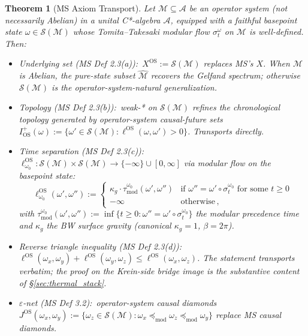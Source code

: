 \documentclass[11pt,a4paper]{article}
\theoremstyle{plain}
\newtheorem{theorem}{Theorem}[section]
\theoremstyle{definition}
\newcommand{\Acal}{\mathcal{A}}
\newcommand{\Scal}{\mathcal{S}}
\newcommand{\Mcal}{\mathcal{M}}
\newcommand{\tmod}{\tau_{\mathrm{mod}}}
\newcommand{\kappag}{\kappa_{g}}
\newcommand{\ellOS}{\ell^{\mathrm{OS}}}
\begin{document}
\begin{theorem}[MS Axiom Transport]\label{thm:axiom_transport}
Let $\Mcal\subseteq\Acal$ be an operator system (not necessarily
Abelian) in a unital C*-algebra $\Acal$, equipped with a faithful
basepoint state $\omega\in\Scal(\Mcal)$ whose Tomita--Takesaki
modular flow $\sigma_{t}^{\omega}$ on $\Mcal$ is well-defined. Then:

\begin{itemize}
\item[(a)] \emph{Underlying set} (MS Def 2.3(a)):\
$X^{\mathrm{OS}}:=\Scal(\Mcal)$ replaces MS's $X$. When $\Mcal$ is
Abelian, the pure-state subset $\widehat{\Mcal}$ recovers the Gelfand
spectrum; otherwise $\Scal(\Mcal)$ is the operator-system-natural
generalization.
\item[(b)] \emph{Topology} (MS Def 2.3(b)):\ weak-* on $\Scal(\Mcal)$
refines the chronological topology generated by operator-system
causal-future sets $I^{+}_{\mathrm{OS}}(\omega):=\{\omega'\in
\Scal(\Mcal):\ellOS(\omega,\omega')>0\}$. Transports directly.
\item[(c)] \emph{Time separation} (MS Def 2.3(c)):\
$\ellOS_{\omega_{0}}:\Scal(\Mcal)\times\Scal(\Mcal)\to
\{-\infty\}\cup[0,\infty]$ via modular flow on the basepoint state:
\begin{equation}
  \ellOS_{\omega_{0}}(\omega',\omega'') := \begin{cases}
    \kappag\cdot\tmod^{\omega_{0}}(\omega',\omega'') & \text{if } \omega''=\omega'\circ\sigma_{t}^{\omega_{0}}\text{ for some }t\ge 0\\
    -\infty & \text{otherwise}\,,
  \end{cases}
  \label{eq:ellOS}
\end{equation}
with $\tmod^{\omega_{0}}(\omega',\omega''):=\inf\{t\ge 0:
\omega''=\omega'\circ\sigma_{t}^{\omega_{0}}\}$ the modular
precedence time and $\kappag$ the BW surface gravity (canonical
$\kappag=1$, $\beta=2\pi$).
\item[(d)] \emph{Reverse triangle inequality} (MS Def 2.3(d)):\
$\ellOS(\omega_{x},\omega_{y})+\ellOS(\omega_{y},\omega_{z})\le
\ellOS(\omega_{x},\omega_{z})$. The statement transports verbatim;
the proof on the Krein-side bridge image is the substantive content
of \S\ref{sec:thermal_stack}.
\item[(e)] \emph{$\varepsilon$-net} (MS Def 3.2):\ operator-system
causal diamonds $J^{\mathrm{OS}}(\omega_{x},\omega_{y}):=\{\omega_{z}
\in\Scal(\Mcal):\omega_{x}\preceq_{\mathrm{mod}}\omega_{z}
\preceq_{\mathrm{mod}}\omega_{y}\}$ replace MS causal diamonds.

\end{itemize}
\end{theorem}
\end{document}
